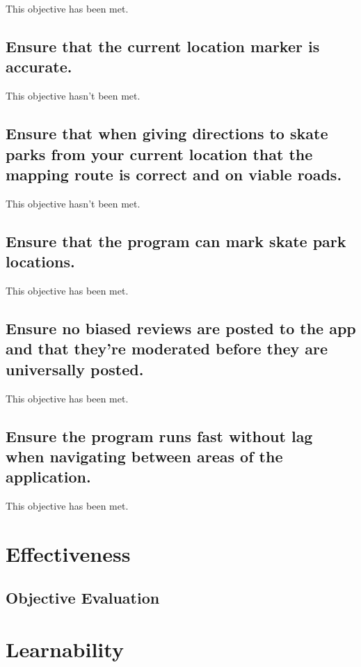 This objective has been met.

\subsection {Ensure that the current location marker is accurate.}

This objective hasn't been met.

\subsection {Ensure that when giving directions to skate parks from your current location that the mapping route is correct and on viable roads. }

This objective hasn't been met.

\subsection {Ensure that the program can mark skate park locations.}

This objective has been met.


\subsection {Ensure no biased reviews are posted to the app and that they're moderated before they are universally posted.}

This objective has been met.

\subsection {Ensure the program runs fast without lag when navigating between areas of the application.}  %

This objective has been met.



\section{Effectiveness}

\subsection{Objective Evaluation}

\section{Learnability}

